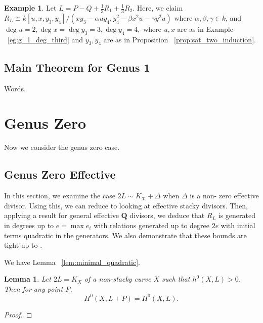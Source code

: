 \documentclass{amsart}
\theoremstyle{plain}
\newtheorem{lem}[thm]{Lemma}
\theoremstyle{definition}
\newtheorem{example}[thm]{Example}
\theoremstyle{remark}
\numberwithin{equation}{section}
\newcommand\ssec{\subsection}
\newcommand \sx{\mathscr X}
\newcommand \halfcan{L}
\begin{document}
\begin{example}
Let $L = P - Q + \frac{1}{3}R_1 + \frac{1}{3}R_2$. Here, we claim $R_L \cong k[u,x,y_3,y_4]/(xy_3- \alpha uy_4,y_4^2 - \beta x^2 u - \gamma y^2u)$ where $\alpha,\beta,\gamma \in k$, and $\deg u = 2, \deg x = \deg y_3 = 3, \deg y_4 = 4,$ where $u,x$ are as in Example ~\ref{eg:g_1_deg_third} and $y_3, y_4$ are as in Proposition ~\ref{prop:sat_two_induction}.  
\end{example}


\ssec{Main Theorem for Genus 1}
Words.





























\section{Genus Zero}
\label{sec:g_0}

Now we consider the genus zero case.

\ssec{Genus Zero Effective}

In this section, we examine the case $2\halfcan\sim K_\sx+\Delta$ 
when $\Delta$ is a non- zero effective divisor.  Using this, we can 
reduce to looking at effective stacky divisors.  Then, applying a 
result for general effective $\mathbf{Q}$ divisors, we deduce that $
R_{\halfcan}$ is generated in degrees up to $e=\max{e_i}$ with 
relations generated up to degree $2e$ with initial terms quadratic 
in the generators.  We also demonstrate that these bounds are tight 
up to .

We have Lemma ~\ref{lem:minimal_quadratic}.


\begin{lem}\label{lem:add_point_effective_divisor_deg_1_but_not_deg_2_generators}
Let $2\halfcan=K_X$ of a non-stacky curve $X$ such that $h^0(X, \halfcan) > 0$.  Then for any point $P$, 
\[
	H^0(X, \halfcan+P)=H^0(X,\halfcan).
\]
\end{lem}
\begin{proof}
\end{proof}
\end{document}
